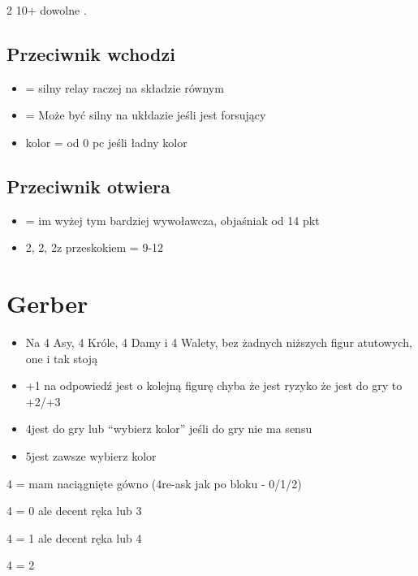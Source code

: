 \documentclass[12pt, a4paper]{article}
\begin{document}
\sequence{{1\clubs}{1\diams}{2\clubs}}
\begin{options}[2]
    \item[2\diams] 10+ dowolne \gf. 
\end{options}

\subsection*{Przeciwnik wchodzi}
\begin{itemize}
	\item \dbl = silny relay raczej na składzie równym
	\item \pass = Może być silny na ukłdazie jeśli jest forsujący
	\item kolor = od 0 pc jeśli ładny kolor
\end{itemize}

\subsection*{Przeciwnik otwiera}
\begin{itemize}
	\item \dbl = im wyżej tym bardziej wywoławcza, objaśniak od 14 pkt
	\item 2\diams, 2\hearts, 2\spades z przeskokiem = 9-12
\end{itemize}

\pagebreak

\section*{Gerber}
\begin{itemize}
	\item Na 4 Asy, 4 Króle, 4 Damy i 4 Walety, bez żadnych niższych figur atutowych, one i tak stoją
	\item +1 na odpowiedź jest o kolejną figurę chyba że jest ryzyko że jest do gry to +2/+3
	\item 4\nt jest do gry lub ``wybierz kolor'' jeśli do gry nie ma sensu
	\item 5\nt jest zawsze wybierz kolor
\end{itemize}

\begin{options}[2]
    \item[4\diams] = mam naciągnięte gówno (4\hearts re-ask jak po bloku - 0/1/2)
    \item[4\hearts] = 0 ale decent ręka lub 3
    \item[4\spades] = 1 ale decent ręka lub 4
    \item[4\nt] = 2
\end{options}
\end{document}

